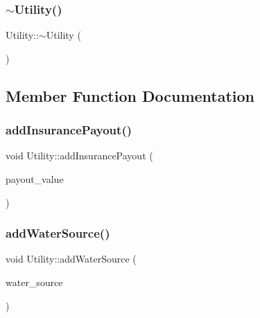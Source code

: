 \mbox{\label{classUtility_aecfe4b31e39b00555158a2d8288b874a_aecfe4b31e39b00555158a2d8288b874a}} 
\subsubsection{\texorpdfstring{$\sim$\+Utility()}{~Utility()}}
{\footnotesize\ttfamily Utility\+::$\sim$\+Utility (\begin{DoxyParamCaption}{ }\end{DoxyParamCaption})}



\subsection{Member Function Documentation}
\mbox{\label{classUtility_a2eaf70b4492ab8ec0e0420d6b7c3b821_a2eaf70b4492ab8ec0e0420d6b7c3b821}} 
\subsubsection{\texorpdfstring{add\+Insurance\+Payout()}{addInsurancePayout()}}
{\footnotesize\ttfamily void Utility\+::add\+Insurance\+Payout (\begin{DoxyParamCaption}\item[{double}]{payout\+\_\+value }\end{DoxyParamCaption})}

\mbox{\label{classUtility_aebbfd65c13e86cfeda8bdfbcc6712587_aebbfd65c13e86cfeda8bdfbcc6712587}} 
\subsubsection{\texorpdfstring{add\+Water\+Source()}{addWaterSource()}}
{\footnotesize\ttfamily void Utility\+::add\+Water\+Source (\begin{DoxyParamCaption}\item[{\mbox{\hyperlink{classWaterSource}{Water\+Source}} $\ast$}]{water\+\_\+source }\end{DoxyParamCaption})}

